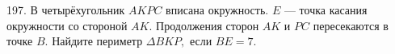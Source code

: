 197. В четырёхугольник $AKPC$ вписана окружность. $E$ --- точка касания окружности со стороной $AK.$ Продолжения сторон $AK$ и $PC$ пересекаются в точке $B.$ Найдите периметр $\Delta BKP,$ если $BE=7.$\\
